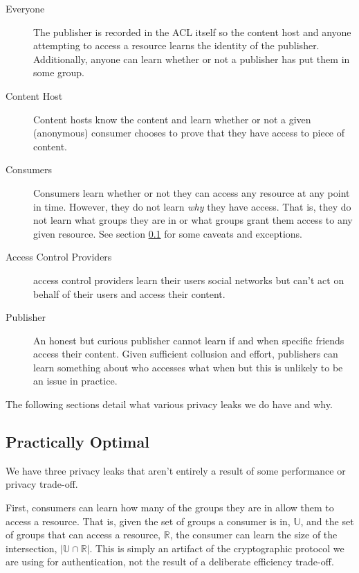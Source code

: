 \documentclass[pdftex,12pt,a4papaer]{report}
\begin{document}
\begin{description}
\item[Everyone] The publisher is recorded in the ACL itself so the content
  host and anyone attempting to access a resource learns the identity of the
  publisher. Additionally, anyone can learn whether or not a publisher
  has put them in some group.
\item[Content Host] Content hosts know the content and learn whether or not a
  given (anonymous) consumer chooses to prove that they have access to piece of
  content.
\item[Consumers] Consumers learn whether or not they can access any resource at
  any point in time. However, they do not learn \emph{why} they have access.
  That is, they do not learn what groups they are in or what groups grant them
  access to any given resource. See section \ref{sub:practically_optimal} for some
  caveats and exceptions.
\item[Access Control Providers] access control providers learn their users
  social networks but can't act on behalf of their users and access their
  content.
\item[Publisher] An honest but curious publisher cannot learn if and
  when specific friends access their content. Given sufficient collusion and
  effort, publishers can learn something about who accesses what when but
  this is unlikely to be an issue in practice.
\end{description}

The following sections detail what various privacy leaks we do have and why.

\subsection{Practically Optimal}
\label{sub:practically_optimal}

We have three privacy leaks that aren't entirely a result of some performance or
privacy trade-off.

First, consumers can learn how many of the groups they are in allow them to
access a resource. That is, given the set of groups a consumer is in,
$\mathbb{U}$, and the set of groups that can access a resource, $\mathbb{R}$,
the consumer can learn the size of the intersection, $|\mathbb{U} \cap
\mathbb{R}|$. This is simply an artifact of the cryptographic protocol we are
using for authentication, not the result of a deliberate efficiency trade-off.
\end{document}
